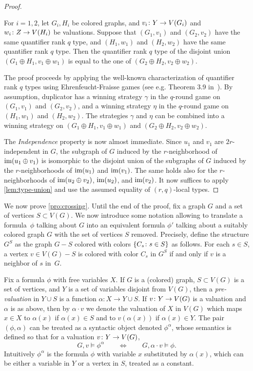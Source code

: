 \begin{proof}
		\begin{claim}\label{lem:type-union}
			For $i=1,2$, let $G_i,H_i$ be colored graphs,
			and $v_i\colon Y\to V(G_i)$ and $w_i\colon Z\to V(H_i)$ be valuations.
			Suppose that $(G_1,v_1)$ and $(G_2,v_2)$ 
			have the same quantifier rank $q$ type,
			and $(H_1,w_1)$ and $(H_2,w_2)$ 
			have the same quantifier rank $q$ type.
			Then the quantifier rank $q$ type of the disjoint union 
			$(G_1\oplus H_1,v_1\oplus w_1)$ is equal to the one of $(G_2\oplus H_2,v_2\oplus w_2)$. \end{claim}
\begin{clproof}[Sketch]
	The proof proceeds by applying the well-known characterization 
	of quantifier rank $q$  types using Ehrenfeucht-Fraisse games (see e.g. Theorem 3.9 in~\cite{libkin}). By assumption, duplicator has a winning strategy $\gamma$ in the $q$-round game on $(G_1,v_1)$ and $(G_2,v_2)$, and a winning strategy $\eta$ in the $q$-round game on $(H_1,w_1)$ and $(H_2,w_2)$. The strategies $\gamma$ and $\eta$ can be combined into a winning strategy on $(G_1\oplus H_1,v_1\oplus w_1)$  and $(G_2\oplus H_2,v_2\oplus w_2)$.
\end{clproof}
The \emph{Independence} property is now almost immediate. Since $u_1$ and $v_1$ are $2r$-independent in $G$, the subgraph of $G$ induced by the $r$-neighborhood of $\mathrm{im}(u_1\oplus v_1)$ is isomorphic to the disjoint union of the subgraphs of $G$ induced by the $r$-neighborhoods of $\mathrm{im}(u_1)$ and $\mathrm{im}(v_1)$. The same holds also for the $r$-neighborhoods of $\mathrm{im}(u_2\oplus v_2)$, 
$\mathrm{im}(u_2)$, and $\mathrm{im}(v_2)$. It now suffices to apply \cref{lem:type-union} and use the assumed equality of $(r,q)$-local types.
\end{proof}

We now prove \cref{pro:crossing}. Until the end of the proof, fix a graph $G$ and a set of vertices $S\subset V(G)$.
We now introduce some notation allowing to translate a  formula~$\phi$ talking about  $G$ into an equivalent formula $\phi'$ talking 
about a suitably colored  graph $G$ with the set of vertices $S$ removed.
Precisely, define the structure $G^{S}$
as the graph $G-S$ colored with colors $\{C_s\colon s\in S\}$ as follows.
For each $s\in S$, a vertex $v\in V(G)-S$
is colored with color $C_s$ in $G^S$ if and only if $v$ is a neighbor of $s$
in~$G$.

Fix a formula $\phi$ with free variables $X$.
If $G$ is a (colored) graph, $S\subset V(G)$ is a set of vertices, and $Y$ is a set of variables disjoint from $V(G)$, then 
a \emph{pre-valuation} in $Y\cup S$ is a 
function $\alpha\colon X\to Y\cup S$.
If $v\colon Y\to V(G)$ is a valuation and $\alpha$ is as above,
then by $\alpha\cdot v$ we denote the valuation of $X$ in $V(G)$
which maps $x\in X$ to $\alpha(x) $ if $\alpha(x)\in S$
and to $v(\alpha(x))$ if $\alpha(x)\in Y$.
 The  pair $(\phi,\alpha)$  can be treated as a
syntactic object denoted  $\phi^{\alpha}$,
 whose semantics is defined so that for a valuation $v\colon Y\to V(G)$, 
$$G,v\models \phi^{\alpha}\qquad\iff \qquad G,\alpha\cdot v\models \phi.$$
Intuitively $\phi^\alpha$ is the formula $\phi$ with variable $x$ substituted by $\alpha(x)$,
which can be either a variable in $Y$ or a vertex in $S$, treated as a constant.


